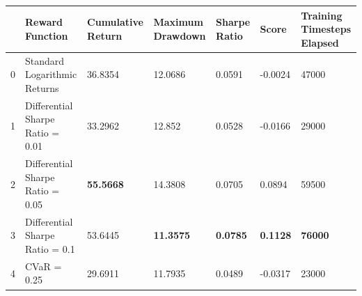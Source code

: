 \begin{tabular}{lllllll}
\toprule
 & Reward Function & Cumulative Return & Maximum Drawdown & Sharpe Ratio & Score & Training Timesteps Elapsed \\
\midrule
0 & Standard Logarithmic Returns & 36.8354 & 12.0686 & 0.0591 & -0.0024 & 47000 \\
1 & Differential Sharpe Ratio = 0.01 & 33.2962 & 12.852 & 0.0528 & -0.0166 & 29000 \\
2 & Differential Sharpe Ratio = 0.05 & \textbf{55.5668} & 14.3808 & 0.0705 & 0.0894 & 59500 \\
3 & Differential Sharpe Ratio = 0.1 & 53.6445 & \textbf{11.3575} & \textbf{0.0785} & \textbf{0.1128} & \textbf{76000} \\
4 & CVaR = 0.25 & 29.6911 & 11.7935 & 0.0489 & -0.0317 & 23000 \\
\bottomrule
\end{tabular}
